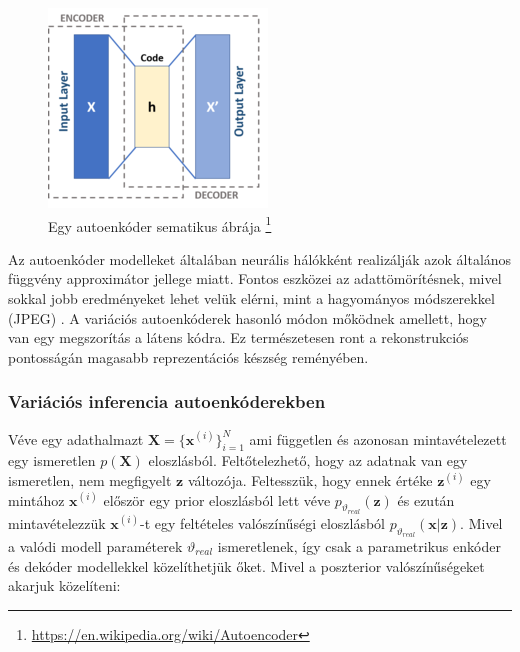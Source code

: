 \documentclass[12pt, english]{article}
\begin{document}
\vspace{4mm}

\begin{figure}[H]
    \centering
    \includegraphics[width=0.3\linewidth]{220px-Autoencoder_schema.png}
    \caption{Egy autoenkóder sematikus ábrája \footnote{\url{https://en.wikipedia.org/wiki/Autoencoder}}}
    \label{fig:auto_encoder_scheme}
\end{figure}

\vspace{4mm}

\par Az autoenkóder modelleket általában neurális hálókként realizálják azok általános függvény approximátor jellege miatt. Fontos eszközei az adattömörítésnek, mivel sokkal jobb eredményeket lehet velük elérni, mint a hagyományos módszerekkel (JPEG) \cite{theis2017lossy}. A variációs autoenkóderek hasonló módon mőködnek amellett, hogy van egy megszorítás a látens kódra. Ez természetesen ront a rekonstrukciós pontosságán magasabb reprezentációs készség reményében.

\vspace{4mm}

\subsubsection{Variációs inferencia autoenkóderekben}

\vspace{4mm}

\par Véve egy adathalmazt $\boldsymbol{X} = \big\{\boldsymbol{\bm{x}}^{(i)}\big\}_{i = 1}^{N}$ ami független és azonosan mintavételezett egy ismeretlen $p(\boldsymbol{X})$ eloszlásból. Feltőtelezhető, hogy az adatnak van egy ismeretlen, nem megfigyelt $\boldsymbol{\bm{z}}$ változója. Feltesszük, hogy ennek értéke $\boldsymbol{\bm{z}}^{(i)}$ egy mintához $\boldsymbol{\bm{x}}^{(i)}$ először egy prior eloszlásból lett véve $p_{\vartheta_{real}}(\boldsymbol{\bm{z}})$ és ezután mintavételezzük $\bm{x}^{(i)}$-t egy feltételes valószínűségi eloszlásból  $p_{\vartheta_{real}}(\boldsymbol{\bm{x}} | \boldsymbol{\bm{z}})$. Mivel a valódi modell paraméterek $\vartheta_{real}$ ismeretlenek, így csak a parametrikus enkóder és dekóder modellekkel közelíthetjük őket. Mivel a poszterior valószínűségeket akarjuk közelíteni:
\end{document}
